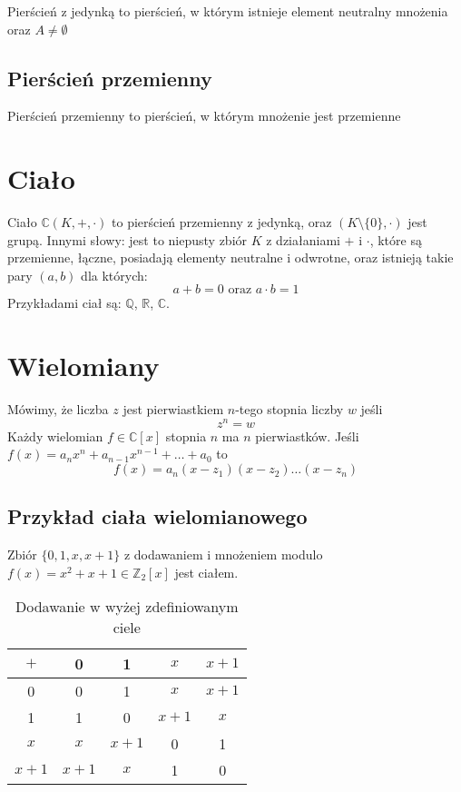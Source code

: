 \documentclass{../notatki}
\begin{document}
Pierścień z jedynką to pierścień, w którym istnieje element neutralny
mnożenia oraz $A \ne \emptyset$

\subsection{Pierścień przemienny}

Pierścień przemienny to pierścień, w którym mnożenie jest przemienne

\section{Ciało}

Ciało $\mathbb{C}(K, +, \cdot)$ to pierścień przemienny z jedynką, oraz $(K
\setminus \{0\}, \cdot)$ jest grupą.
Innymi słowy: jest to niepusty zbiór $K$ z działaniami $+$ i $\cdot$, które
są przemienne, łączne, posiadają elementy neutralne i odwrotne, oraz
istnieją takie pary $(a, b)$ dla których:
$$
a + b = 0 \text{ oraz } a \cdot b = 1
$$
Przykładami ciał są: $\mathbb{Q}$, $\mathbb{R}$, $\mathbb{C}$.

\section{Wielomiany}

Mówimy, że liczba $z$ jest pierwiastkiem $n$-tego stopnia liczby $w$ jeśli
$$
z^n = w
$$
Każdy wielomian $f \in \mathbb{C}[x]$ stopnia $n$ ma $n$
pierwiastków. Jeśli $f(x) = a_n x^n + a_{n-1} x^{n-1} + \dots + a_0$ to
$$
f(x) = a_n (x - z_1)(x - z_2) \dots (x - z_n)
$$

\subsection{Przykład ciała wielomianowego}

Zbiór $\{0, 1, x, x+1\}$ z dodawaniem i mnożeniem modulo $f(x) = x^2
+ x + 1 \in \mathbb{Z}_2[x]$ jest ciałem.

\begin{table*}[h]
  \centering
  \begin{tabular}{c|cccc}
    \hline
    $+$ & 0 & 1 & $x$ & $x + 1$ \\
    \hline
    0 & 0 & 1 & $x$ & $x + 1$ \\
    1 & 1 & 0 & $x + 1$ & $x$ \\
    $x$ & $x$ & $x + 1$ & 0 & 1 \\
    $x + 1$ & $x + 1$ & $x$ & 1 & 0 \\
    \hline
  \end{tabular}
  \caption{Dodawanie w wyżej zdefiniowanym ciele}
\end{table*}
\end{document}
